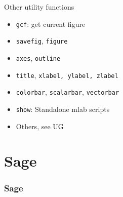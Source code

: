 \documentclass[14pt,compress]{beamer}
\newcommand{\PythonCode}[1]{\lstinline{#1}}
\begin{document}
\begin{frame}[plain]
    {Other utility functions}
    \Large
    \begin{itemize}
        \item \PythonCode{gcf}: get current figure
            \pause
        \item \PythonCode{savefig}, \PythonCode{figure}
            \pause
        \item \PythonCode{axes}, \PythonCode{outline}
            \pause
        \item \PythonCode{title}, \PythonCode{xlabel, ylabel, zlabel}
            \pause
        \item \PythonCode{colorbar}, \PythonCode{scalarbar},
            \PythonCode{vectorbar}
            \pause
        \item \PythonCode{show}: Standalone mlab scripts
            \pause
        \item Others, see UG
    \end{itemize}

\end{frame}

\section{Sage}

\begin{frame}[plain]
    \frametitle{Sage}
  \begin{center}    
  \end{center}
\end{frame}
\end{document}
